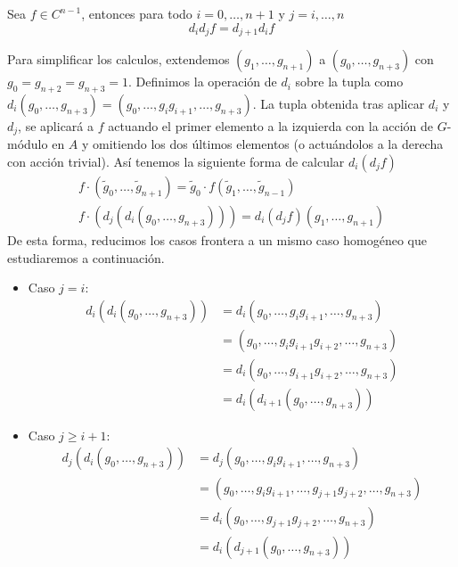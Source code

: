 
\begin{lema}\label{lem:coborde}
	Sea $f\in C^{n-1}$, entonces para todo $i=0,\ldots,n+1$ y $j=i,\ldots,n$
	\begin{equation}
		d_id_jf=d_{j+1}d_if
	\end{equation}
	\begin{demostracion}
		Para simplificar los calculos, extendemos $(g_1,\ldots,g_{n+1})$ a $(g_0,\ldots,g_{n+3})$ con $g_0=g_{n+2}=g_{n+3}=1$.
		Definimos la operación de $d_i$ sobre la tupla como $d_i(g_0,\ldots,g_{n+3}) = (g_0,\ldots,g_ig_{i+1},\ldots,g_{n+3})$. La tupla obtenida tras aplicar $d_i$ y $d_j$, se aplicará a $f$ actuando el primer elemento a la izquierda con la acción de $G$-módulo en $A$ y omitiendo los dos últimos elementos (o actuándolos a la derecha con acción trivial). Así tenemos la siguiente forma de calcular $d_i(d_jf)$
		\begin{align}
			f\cdot (\tilde g_0,\ldots,\tilde g_{n+1}) = \tilde g_0 \cdot f(\tilde g_1,\ldots,\tilde g_{n-1})  \\
			f\cdot (d_j(d_i(g_0,\ldots,g_{n+3}))) = d_i(d_jf)(g_1,\ldots,g_{n+1})	\label{eq:homcohom}
		\end{align}
		De esta forma, reducimos los casos frontera a un mismo caso homogéneo que estudiaremos a continuación.
		
		\begin{itemize}
			\item Caso $j=i$:
				\begin{align*}
					d_i(d_i(g_0,\ldots,g_{n+3})) 
					&= d_i(g_0,\ldots,g_ig_{i+1},\ldots,g_{n+3}) \\
					&= (g_0,\ldots,g_ig_{i+1}g_{i+2},\ldots,g_{n+3}) \\
					&= d_i(g_0,\ldots,g_{i+1}g_{i+2},\ldots,g_{n+3}) \\
					&= d_i(d_{i+1}(g_0,\ldots,g_{n+3}))
				\end{align*}
			\item Caso $j\geq i+1$:
				\begin{align*}
					d_j(d_i(g_0,\ldots,g_{n+3})) 
					&= d_j(g_0,\ldots,g_ig_{i+1},\ldots,g_{n+3}) \\
					&= (g_0,\ldots,g_ig_{i+1},\ldots,g_{j+1}g_{j+2},\ldots,g_{n+3}) \\
					&= d_i(g_0,\ldots,g_{j+1}g_{j+2},\ldots,g_{n+3}) \\
					&= d_i(d_{j+1}(g_0,\ldots,g_{n+3}))
				\end{align*}
		\end{itemize}
		

\end{demostracion}
\end{lema}
